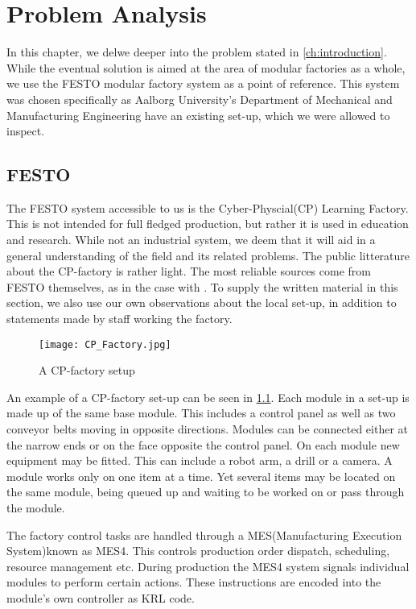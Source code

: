 \chapter{Problem Analysis}\label{ch:problemanalysis}
In this chapter, we delwe deeper into the problem stated in \cref{ch:introduction}. While the eventual solution is aimed at the area of modular factories as a whole, we use the FESTO modular factory system \cite{FESTOweb} as a point of reference. This system was chosen specifically as Aalborg University's Department of Mechanical and Manufacturing Engineering have an existing set-up, which we were allowed to inspect. 

\section{FESTO}\label{sec:festo}
The FESTO system accessible to us is the Cyber-Physcial(CP) Learning Factory. This is not intended for full fledged production, but rather it is used in education and research. While not an industrial system, we deem that it will aid in a general understanding of the field and its related problems. The public litterature about the CP-factory is rather light. The most reliable sources come from FESTO themselves, as in the case with \cite{CPFactory2015}. To supply the written material in this section, we also use our own observations about the local set-up, in addition to statements made by staff working the factory.  

\begin{figure}[h]
\centering
\texttt{[image: CP\_Factory.jpg]}
\caption{A CP-factory setup}
\label{fig:festo-example}
\end{figure}

An example of a CP-factory set-up can be seen in \cref{fig:festo-example}. Each module in a set-up is made up of the same base module. This includes a control panel as well as two conveyor belts moving in opposite directions. Modules can be connected either at the narrow ends or on the face opposite the control panel. On each module new equipment may be fitted. This can include a robot arm, a drill or a camera. A module works only on one item at a time. Yet several items may be located on the same module, being queued up and waiting to be worked on or pass through the module.

The factory control tasks are handled through a MES(Manufacturing Execution System)known as MES4. This controls production order dispatch, scheduling, resource management etc. During production the MES4 system signals individual modules to perform certain actions. These instructions are encoded into the module's own controller as KRL code.

